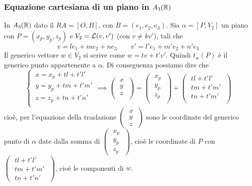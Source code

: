 \begin{figure}[ht]
    \centering
    \def\svgwidth{160pt}
    \label{fig:simmetria-punto-retta}
\end{figure}

\subsubsection{Equazione cartesiana di un piano in \(A_3(\RR )\)}
In \(A_3(\RR )\) dato il \(RA = [O, B]\), con \(B = (e_1, e_2, e_3)\). Sia \(\alpha = [P, V_2]\) un piano con \(P = (x_p, y_p, z_p)\) e \(V_2 = \mathcal{L}(v, v') \) (con \(v \neq kv'\)), tali che  \[
v = le_1 + me_2 + ne_3 \qquad 
v' = l'e_1 + m'e_2 + n'e_3
\] 
Il generico vettore \(w \in V_2\) si scrive come \(w = tv + t' v'\). Quindi \(t_w(P)\) è il generico punto appartenente a \(\alpha \). Di conseguenza possiamo dire che \[
\begin{cases}
    \ x = x_p + tl + t'l' \\
    \ y = y_p + tm + t'm' \\
    \ z = z_p + tn + t'n' \\
\end{cases} \implies 
\left( \;
 \begin{matrix}
    x \\
    y \\
    z \\
\end{matrix} \;
 \right) =
\left( \;
 \begin{matrix}
    x_p \\
    y_p \\
    z_p \\
\end{matrix} \;
 \right) +
\left( \;
 \begin{matrix}
    tl + t'l' \\
    tm + t'm' \\
    tn + t'm' \\
\end{matrix} \;
 \right) 
\] cioè, per l'equazione della traslazione \(\left( \; \begin{matrix} x \\ y\\ z \end{matrix} \; \right) \) sono le coordinate del generico punto di \(\alpha \) date dalla somma di \(\left( \; \begin{matrix} x_p \\ y_p\\ z_p \end{matrix} \; \right) \), cioè le coordinate di \(P\) con \(\left( \; \begin{matrix} tl + t'l' \\ tm + t'm'\\ tn + t'n' \end{matrix} \; \right) \), cioè le componenti di \(w\).

